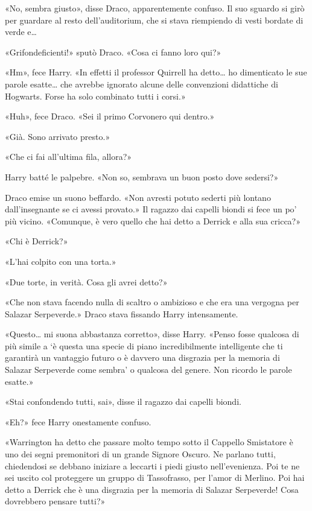«No, sembra giusto», disse Draco, apparentemente confuso. Il suo sguardo si girò per guardare al resto dell’auditorium, che si stava riempiendo di vesti bordate di verde e…

«Grifondeficienti!» sputò Draco. «Cosa ci fanno loro qui?»

«Hm», fece Harry. «In effetti il professor Quirrell ha detto… ho dimenticato le sue parole esatte… che avrebbe ignorato alcune delle convenzioni didattiche di Hogwarts. Forse ha solo combinato tutti i corsi.»

«Huh», fece Draco. «Sei il primo Corvonero qui dentro.»

«Già. Sono arrivato presto.»

«Che ci fai all’ultima fila, allora?»

Harry batté le palpebre. «Non so, sembrava un buon posto dove sedersi?»

Draco emise un suono beffardo. «Non avresti potuto sederti più lontano dall’insegnante se ci avessi provato.» Il ragazzo dai capelli biondi si fece un po’ più vicino. «Comunque, è vero quello che hai detto a Derrick e alla sua cricca?»

«Chi è Derrick?»

«L’hai colpito con una torta.»

«Due torte, in verità. Cosa gli avrei detto?»

«Che non stava facendo nulla di scaltro o ambizioso e che era una vergogna per Salazar Serpeverde.» Draco stava fissando Harry intensamente.

«Questo… mi suona abbastanza corretto», disse Harry. «Penso fosse qualcosa di più simile a ‘è questa una specie di piano incredibilmente intelligente che ti garantirà un vantaggio futuro o è davvero una disgrazia per la memoria di Salazar Serpeverde come sembra’ o qualcosa del genere. Non ricordo le parole esatte.»

«Stai confondendo tutti, sai», disse il ragazzo dai capelli biondi.

«Eh?» fece Harry onestamente confuso.

«Warrington ha detto che passare molto tempo sotto il Cappello Smistatore è uno dei segni premonitori di un grande Signore Oscuro. Ne parlano tutti, chiedendosi se debbano iniziare a leccarti i piedi giusto nell’evenienza. Poi te ne sei uscito col proteggere un gruppo di Tassofrasso, per l’amor di Merlino. Poi hai detto a Derrick che è una disgrazia per la memoria di Salazar Serpeverde! Cosa dovrebbero pensare tutti?»


